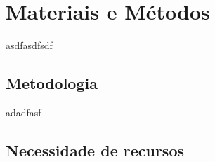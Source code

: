 \chapter{Materiais e Métodos}
\label{chap:mat}
asdfasdfsdf

\section{Metodologia}
\label{sec:met}
adadfasf

\section{Necessidade de recursos}

\begin{comment}
\section{Descrição do sistema}
\label{sec:desc}
lasdjflsadjf

\subsection{Especificação técnica}
\label{ssec:espt}
lakjfldksjfdslakjf

\subsection{Arquitetura geral do sistema}
\label{ssec:arqg}
lkasjdflksdajflk;

\subsection{Arquitetura de software}
\label{ssec:arqs}

\section{Desdobramento da função qualidade}
\label{sec:qfd}
asdfsdafsf

\subsection{Requisitos do cliente}
\label{ssec:reqc}
asdfsadfdsf

\subsection{Requisitos técnicos}
\label{ssec:reqt}
asdfsadfdsf


\end{comment}

